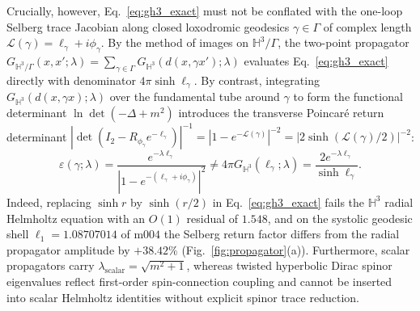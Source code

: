 \documentclass[aps,prd,twocolumn,nofootinbib,floatfix]{revtex4-2}
\begin{document}
Crucially, however, Eq.~\eqref{eq:gh3_exact} must not be conflated with the one-loop Selberg trace Jacobian along closed loxodromic geodesics $\gamma \in \Gamma$ of complex length $\mathcal{L}(\gamma) = \ell_\gamma + i\phi_\gamma$.
By the method of images on $\mathbb{H}^3/\Gamma$, the two-point propagator $G_{\mathbb{H}^3/\Gamma}(x,x';\lambda) = \sum_{\gamma\in\Gamma} G_{\mathbb{H}^3}(d(x,\gamma x');\lambda)$ evaluates Eq.~\eqref{eq:gh3_exact} directly with denominator $4\pi\sinh\ell_\gamma$.
By contrast, integrating $G_{\mathbb{H}^3}(d(x,\gamma x);\lambda)$ over the fundamental tube around $\gamma$ to form the functional determinant $\ln\det(-\Delta + m^2)$ introduces the transverse Poincar\'e return determinant $|\det(I_2 - R_{\phi_\gamma} e^{-\ell_\gamma})|^{-1} = |1 - e^{-\mathcal{L}(\gamma)}|^{-2} = |2\sinh(\mathcal{L}(\gamma)/2)|^{-2}$:
\begin{equation}
\label{eq:selberg_return}
\varepsilon(\gamma;\lambda) = \frac{e^{-\lambda\ell_\gamma}}{|1 - e^{-(\ell_\gamma + i\phi_\gamma)}|^2} \ne 4\pi G_{\mathbb{H}^3}(\ell_\gamma;\lambda) = \frac{2 e^{-\lambda\ell_\gamma}}{\sinh\ell_\gamma}.
\end{equation}
Indeed, replacing $\sinh r$ by $\sinh(r/2)$ in Eq.~\eqref{eq:gh3_exact} fails the $\mathbb{H}^3$ radial Helmholtz equation with an $O(1)$ residual of $1.548$, and on the systolic geodesic shell $\ell_1 = 1.08707014$ of $\mathrm{m004}$ the Selberg return factor differs from the radial propagator amplitude by $+38.42\%$ (Fig.~\ref{fig:propagator}(a)).
Furthermore, scalar propagators carry $\lambda_{\mathrm{scalar}} = \sqrt{m^2 + 1}$, whereas twisted hyperbolic Dirac spinor eigenvalues reflect first-order spin-connection coupling and cannot be inserted into scalar Helmholtz identities without explicit spinor trace reduction.
\end{document}
